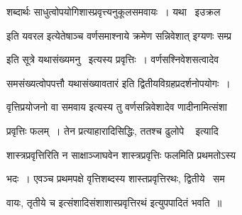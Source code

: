 \documentclass[11pt, openany]{book}
\begin{document}
शब्दार्थः साधुत्वोपयोगिशास्प्रवृत्त्यनुकूलसमवायः~। यथा \textendash\ इउक्रल 

इति यवरल इत्येतेषाञ्च वर्णसमाश्नाये क्रमेण सन्निवेशात् {\qt इग्यणः सम्प्र \textendash\ }


इति सूत्रे यथासंख्यमनु \textendash\ इत्यस्य प्रवृत्तिः~। वर्णसश्निवेशसत्वादेव 

समसंख्यत्वोपपत्तौ यथासंख्यावतारं इति द्वितीयविग्रहप्रदर्शनोपयोगः~। 

वृत्तिप्रयोजनो वा समवाय इत्यस्य तु वर्णसन्निवेशादेव णादीनामित्संशा \textendash\ 

प्रवृत्तिः फलम्~। तेन प्रत्याहारादिसिद्धिः, ततश्च {\qt ढुलोपे \textendash\ } इत्यादि \textendash\ 

शास्त्रप्रवृत्तिरिति न साक्षाञ्जाघवेन शास्त्रप्रवृत्तिः फलमिति
प्रथमतोऽस्य 

भदः~। एवञ्च प्रथमपक्षे वृत्तिशब्दस्य शास्तप्रवृत्तिरथः, द्वितीये \textendash\ सम \textendash\ 

वायः, तृतीये च इत्संशादिसंशाशास्प्रवृत्तिरथं इत्युपपादितं भवति~॥
\end{document}
